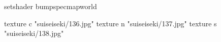 setshader bumpspecmapworld

    texture c "suiseiseki/136.jpg"
    texture n "suiseiseki/137.jpg"
    texture s "suiseiseki/138.jpg"
